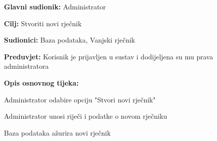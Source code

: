 					\noindent {}
					\begin{packed_item}
	
						\item \textbf{Glavni sudionik: }Administrator
						\item  \textbf{Cilj:} Stvoriti novi rječnik
						\item  \textbf{Sudionici:} Baza podataka, Vanjski rječnik
						\item  \textbf{Preduvjet:} Korisnik je prijavljen u sustav i dodijeljena su mu prava administratora
						\item  \textbf{Opis osnovnog tijeka:}
						
						\item[] \begin{packed_enum}
	
							\item Administrator odabire opciju "Stvori novi rječnik"
							\item Administrator unosi riječi i podatke o novom rječniku
							\item Baza podataka ažurira novi rječnik
						\end{packed_enum}
						
					\end{packed_item}

